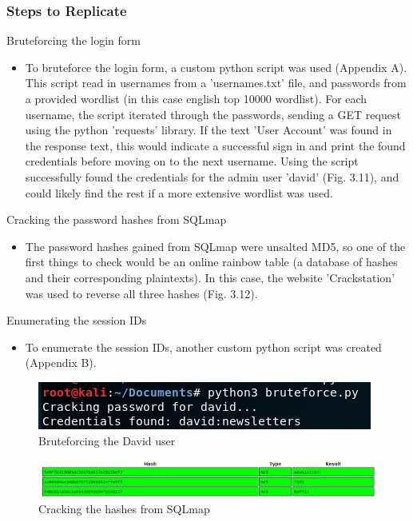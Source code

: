 \documentclass{report}
\begin{document}
\subsubsection{Steps to Replicate}
Bruteforcing the login form
\begin{itemize}
	\item To bruteforce the login form, a custom python script was used (Appendix A). This script read in usernames from a 'usernames.txt' file, and passwords from a provided wordlist (in this case english top 10000 wordlist). For each username, the script iterated through the passwords, sending a GET request using the python 'requests' library. If the text 'User Account' was found in the response text, this would indicate a successful sign in and print the found credentials before moving on to the next username.
	Using the script successfully found the credentials for the admin user 'david' (Fig. 3.11), and could likely find the rest if a more extensive wordlist was used.	
\end{itemize}
Cracking the password hashes from SQLmap
\begin{itemize}
	\item The password hashes gained from SQLmap were unsalted MD5, so one of the first things to check would be an online rainbow table (a database of hashes and their corresponding plaintexts). In this case, the website 'Crackstation' was used to reverse all three hashes (Fig. 3.12).
\end{itemize}
Enumerating the session IDs
\begin{itemize}
	\item To enumerate the session IDs, another custom python script was created (Appendix B). 
\end{itemize}
\begin{figure}[!htb]
	\centering
	\includegraphics[scale=0.7]{img/bruteforce1.png}
	\caption{Bruteforcing the David user}
\end{figure}
\begin{figure}[!htb]
	\centering
	\includegraphics[scale=0.5]{img/crackstation.png}
	\caption{Cracking the hashes from SQLmap}
\end{figure}
\end{document}
